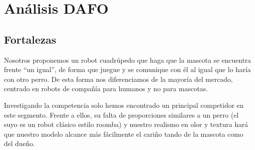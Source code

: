 \section{Análisis DAFO}  

\begin{figure}[H]
    \centering
\end{figure}

\subsection{Fortalezas}

Nosotros proponemos un robot cuadrúpedo que haga que la mascota se encuentra frente ``un igual'', de forma que juegue y se comunique con él al igual que lo haría con otro perro. De esta forma nos diferenciamos de la mayoría del mercado, centrado en robots de compañía para humanos y no para mascotas. 

Investigando la competencia solo hemos encontrado un principal competidor en este segmento. Frente a ellos, su falta de proporciones similares a un perro (el suyo es un robot clásico estilo roomba) y nuestro realismo en olor y textura hará que nuestro modelo alcance más fácilmente el cariño tando de la mascota como del dueño.

